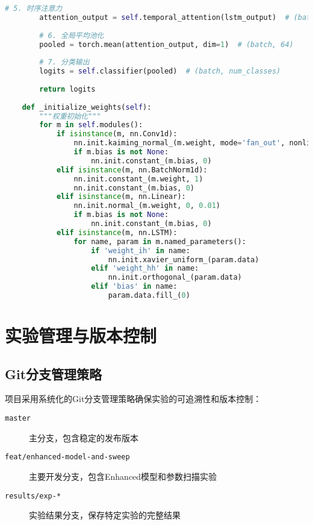 \begin{lstlisting}[language=Python,caption=Enhanced模型完整实现]
        # 5. 时序注意力
        attention_output = self.temporal_attention(lstm_output)  # (batch, time, 64)
        
        # 6. 全局平均池化
        pooled = torch.mean(attention_output, dim=1)  # (batch, 64)
        
        # 7. 分类输出
        logits = self.classifier(pooled)  # (batch, num_classes)
        
        return logits
    
    def _initialize_weights(self):
        """权重初始化"""
        for m in self.modules():
            if isinstance(m, nn.Conv1d):
                nn.init.kaiming_normal_(m.weight, mode='fan_out', nonlinearity='relu')
                if m.bias is not None:
                    nn.init.constant_(m.bias, 0)
            elif isinstance(m, nn.BatchNorm1d):
                nn.init.constant_(m.weight, 1)
                nn.init.constant_(m.bias, 0)
            elif isinstance(m, nn.Linear):
                nn.init.normal_(m.weight, 0, 0.01)
                if m.bias is not None:
                    nn.init.constant_(m.bias, 0)
            elif isinstance(m, nn.LSTM):
                for name, param in m.named_parameters():
                    if 'weight_ih' in name:
                        nn.init.xavier_uniform_(param.data)
                    elif 'weight_hh' in name:
                        nn.init.orthogonal_(param.data)
                    elif 'bias' in name:
                        param.data.fill_(0)
\end{lstlisting}

\section{实验管理与版本控制}
\label{sec:experiment_management}

\subsection{Git分支管理策略}
\label{subsec:git_strategy}

项目采用系统化的Git分支管理策略确保实验的可追溯性和版本控制：

\begin{description}
\item[\texttt{master}] 主分支，包含稳定的发布版本
\item[\texttt{feat/enhanced-model-and-sweep}] 主要开发分支，包含Enhanced模型和参数扫描实验
\item[\texttt{results/exp-*}] 实验结果分支，保存特定实验的完整结果
\end{description}

